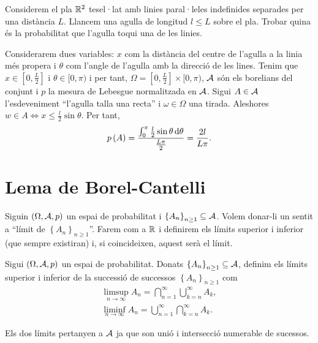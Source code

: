 \begin{problema}
  Considerem el pla $\mathbb{R}^2$ tesel·lat amb linies paral·leles indefinides separades per una distància $L$. Llancem una agulla de longitud $l\leq L$ sobre el pla.
  Trobar quina és la probabilitat que l'agulla toqui una de les linies.
\end{problema}
\begin{sol}
  Considerarem dues variables: $x$ com la distància del centre de l'agulla a la linia més propera i $\theta$ com l'angle de l'agulla amb la direcció de les lines.
  Tenim que $x\in\left[0,\frac{L}{2}\right]$ i $\theta\in[0,\pi)$ i per tant, $\Omega =\left[0,\frac{L}{2}\right]\times[0,\pi)$, $\mathcal{A}$ són els borelians 
  del conjunt i $p$ la mesura de Lebesgue normalitzada en $\mathcal{A}$. Sigui $A\in\mathcal{A}$ l'esdeveniment ``l'agulla talla una recta'' i $\omega\in\Omega$ una tirada.
  Aleshores $w\in A \iff x\leq \frac{l}{2}\sin\theta$. Per tant,
  \[
   p\lp A\rp = \frac{\int_0^{\pi}\frac{l}{2}\sin\theta \dif\theta}{\frac{L\pi}{2}}=\frac{2l}{L\pi}.
  \]
\end{sol}

\section{Lema de Borel-Cantelli}
Siguin $\left(\Omega,\mathcal{A} ,p\right)$ un espai de probabilitat i $\left\{ A_n\right\}_{n\geq1} \subseteq \mathcal{A}$. Volem donar-li 
un sentit a ``límit de $\left\{ A_n\right\}_{n\geq1}$''. Farem com a $\mathbb{R}$ i definirem els límits superior i inferior 
(que sempre existiran) i, si coincideixen, aquest serà el límit.

\begin{defi}
  Sigui $\left(\Omega,\mathcal{A},p\right)$ un espai de probabilitat. Donats $\left\{ A_n\right\}_{n\geq1} \subseteq \mathcal{A}$, definim els límits superior i inferior de la successió de successos $\left\{ A_n\right\}_{n\geq1}$ com
  \begin{gather*}
    \limsup_{n\to\infty} A_n = \bigcap_{n=1}^{\infty}\bigcup_{k=n}^{\infty} A_k ,\\
    \liminf_{n\to\infty} A_n = \bigcup_{n=1}^{\infty}\bigcap_{k=n}^{\infty} A_k.
  \end{gather*}
\end{defi}

\begin{obs}
  Els dos límits pertanyen a $\mathcal{A}$ ja que son unió i intersecció numerable de sucessos.
\end{obs}

